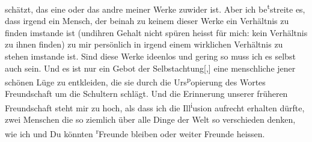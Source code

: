                schätzt, das eine oder das andre meiner Werke zuwider ist. Aber ich be\substVorne{}\textsuperscript{t}\substDazwischen{}st\substHinten{}reite es, dass irgend ein Mensch, der beinah zu keinem dieser Werke ein
               Verhältnis zu finden imstande ist (un\introOben{}d\introOben{}{ }ihren Gehalt nicht spüren heisst für mich\introOben{}:\introOben{} kein Verhältnis zu ihnen finden) zu mir persönlich in
               irgend einem wirklichen Verhältnis zu stehen imstande {\pb}ist. Sind diese Werke ideenlos und
               gering so muss ich es selbst auch sein. Und es ist nur ein Gebot der
                  Selbstachtung{[},{]} eine menschliche \label{T_L03520-3v}\label{T_L03520-3h} jener schönen Lüge zu
               entkleiden, die sie durch die Urs\substVorne{}\textsuperscript{p}\substDazwischen{}o\substHinten{}pierung des  Wortes Freundschaft um
               die Schultern schlägt. Und die Erinnerung unserer früheren Freundschaft steht \introOben{}mi\introOben{}r zu hoch, als dass ich die Ill\substVorne{}\textsuperscript{i}\substDazwischen{}u\substHinten{}sion aufrecht erhalten dürfte, zwei Menschen die so ziemlich über alle Dinge
               der Welt so verschieden denken, wie ich und Du könnten \substVorne{}\textsuperscript{r}\substDazwischen{}F\substHinten{}reunde bleiben oder weiter Freunde heissen.\pend
           \endnumbering{}
\begin{anhang}
\end{anhang}
      
